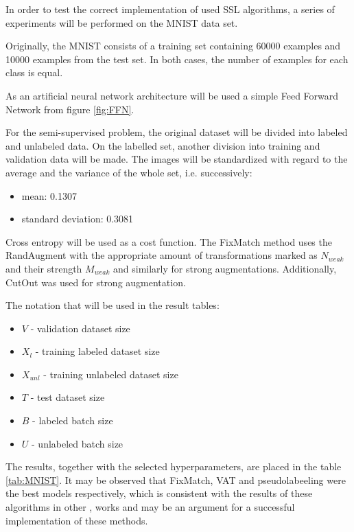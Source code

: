 \documentclass[12pt]{article}
\theoremstyle{definition}
\DeclareRobustCommand{\[}{\begin{equation}}
\DeclareRobustCommand{\]}{\end{equation}}
\begin{document}
\begin{minipage}{0.6\linewidth}
In order to test the correct implementation of used SSL algorithms, a series of experiments will be performed on the MNIST data set. \cite{lecun-mnisthandwrittendigit-2010}\par 
Originally, the MNIST consists of a training set containing 60000 examples and 10000 examples from the test set. In both cases, the number of examples for each class is equal.\par

As an artificial neural network architecture will be used a simple Feed Forward Network from figure \ref{fig:FFN}.

For the semi-supervised problem, the original dataset will be divided into labeled and unlabeled data. On the labelled set, another division into training and validation data will be made. \newline
The images will be standardized with regard to the average and the variance of the whole set, i.e. successively:
    \begin{itemize}
        \item mean: 0.1307
        \item standard deviation: 0.3081
    \end{itemize}
    \newline
Cross entropy will be used as a cost function.
The FixMatch method uses the RandAugment \cite{RandAugment} with the appropriate amount of transformations marked as $N_{weak}$ and their strength $M_{weak}$ and similarly for strong augmentations. Additionally, CutOut \cite{Cutout} was used for strong augmentation.
\par The notation that will be used in the result tables:
\begin{itemize}
    \item $V$ - validation dataset size
    \item $X_l$ - training labeled dataset size
    \item $X_{unl}$ - training unlabeled dataset size
    \item $T$ - test dataset size
    \item $B$ - labeled batch size
    \item $U$ - unlabeled batch size
\end{itemize}
\end{minipage}
\newpage
The results, together with the selected hyperparameters, are placed in the table \ref{tab:MNIST}.
It may be observed that FixMatch, VAT and pseudolabeeling were the best models respectively, which is consistent with the results of these algorithms in other \cite{Realistic}, \cite{FixMatch} works and may be an argument for a successful implementation of these methods.
\end{document}
